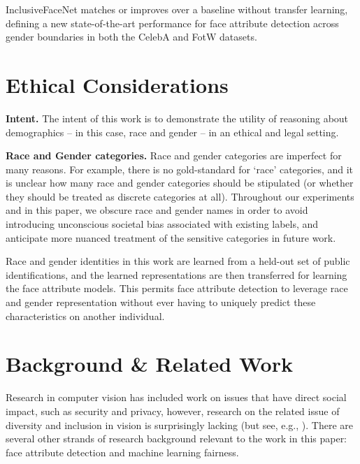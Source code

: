 \documentclass{article}
\begin{document}
InclusiveFaceNet matches or improves over a  baseline without transfer learning, defining a new state-of-the-art performance for face attribute detection across gender boundaries in both the CelebA \cite{liuetal2015celeba} and FotW \cite{escaleraetal2017chalearn} datasets.\vspace{-1em}

\section{Ethical Considerations}\label{sec:ethical}
{\bf Intent.} The intent of this work is to demonstrate the utility
of reasoning about demographics -- in this case, race and
gender -- in an ethical and legal setting.

{\bf Race and Gender categories.} Race and gender categories are imperfect for many reasons. For example, there is no gold-standard for `race' categories, and it is unclear how many race and gender categories should be stipulated (or whether they should be treated as discrete categories at all). Throughout our experiments and in this paper, we obscure race and gender names in order to avoid introducing unconscious societal bias associated with existing labels, and anticipate more nuanced treatment of the sensitive categories in future work.

Race and gender identities in this work are learned from a held-out set of public identifications, and the learned representations are then transferred for learning the face attribute models. This permits face attribute detection to leverage race and gender representation without ever having to uniquely predict these characteristics on another individual.\vspace{-.5em}

\section{Background \& Related Work}\label{sec:related_work}

Research in computer vision has included work on issues that have direct social impact, such as security and privacy, however, research on the related issue of diversity and inclusion in vision is surprisingly lacking (but see, e.g., \cite{buolamwini2016ted}). There are several other strands of research background relevant to the work in this paper: face attribute detection and machine learning fairness.
\end{document}

